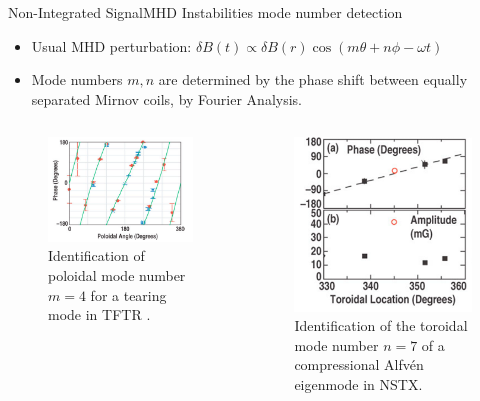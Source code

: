 \documentclass{beamer}
\begin{document}
\begin{frame}{Non-Integrated Signal}{MHD Instabilities mode number detection}
	\begin{itemize}
		\item Usual MHD perturbation: $\delta B(t) \propto \delta B(r) \cos (m\theta + n\phi -\omega t ) $
		\item Mode numbers {\color{red}  $m, n$}  are determined by the phase shift between equally separated Mirnov coils, by Fourier Analysis.
	\end{itemize}
	\begin{columns}
		\begin{figure}[ht]
			\begin{center}
				\includegraphics[width=0.6 \columnwidth]{TFTR.png}
				\caption{\tiny Identification of poloidal mode number {\color{red}  $m=4$} for a tearing mode in TFTR	.}
			\end{center}
		\end{figure}
		\begin{figure}[ht]
			\begin{center}
				\includegraphics[width=0.4 \columnwidth]{NSTX.png}
				\caption{\tiny Identification of the toroidal mode number {\color{red}  $n=7$} of a compressional Alfvén eigenmode in NSTX.}
			\end{center}
		\end{figure}
 	 \end{columns}  	
\end{frame}
\end{document}
